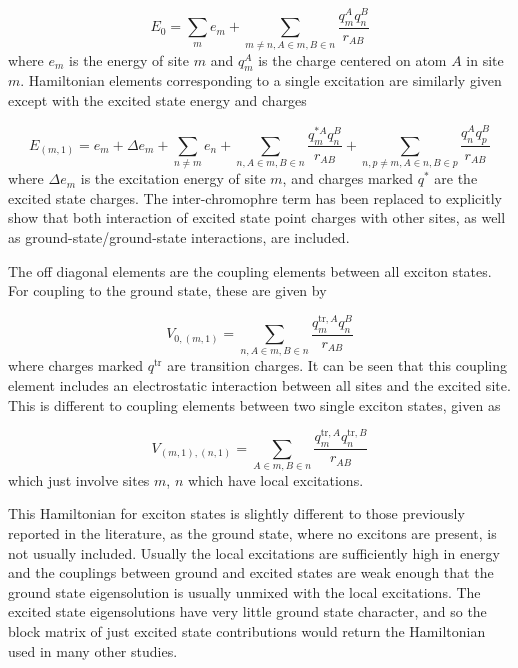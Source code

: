 \begin{equation}
    E_0 = \sum_m e_m + \sum_{m \neq n, A \in m, B \in n} \frac{q^A_m q^B_n}{r_{AB}}
\end{equation}
%
where $e_m$ is the energy of site $m$ and $q^A_m$ is the charge centered on atom
$A$ in site $m$. Hamiltonian elements corresponding to a single excitation are similarly
given except with the excited state energy and charges

\begin{equation}
    E_{\left(m,1\right)} = e_m + \Delta e_m + \sum_{n \neq m} e_n + \sum_{n, A \in m, B \in n} \frac{q^{\ast A}_m q^B_n}{r_{AB}} + \sum_{n,p \neq m, A \in n, B \in p} \frac{q^{A}_n q^B_p}{r_{AB}}
\end{equation}
%
where $\Delta e_m$ is the excitation energy of site $m$, and charges marked $q^\ast$
are the excited state charges. The inter-chromophre term has been replaced to explicitly
show that both interaction of excited state point charges with other sites, as well
as ground-state/ground-state interactions, are included.

The off diagonal elements are the coupling elements between all exciton states.
For coupling to the ground state, these are given by

\begin{equation}
    V_{0, \left(m,1\right)} = \sum_{n, A \in m, B \in n} \frac{q^{\text{tr},A}_m q^B_n}{r_{AB}}
\end{equation}
%
where charges marked $q^{\text{tr}}$ are transition charges. It can be seen that 
this coupling element includes an electrostatic interaction between all sites and
the excited site. This is different to coupling elements between two single exciton
states, given as

\begin{equation}
    V_{\left(m, 1\right), \left(n,1\right)} = \sum_{A \in m, B \in n} \frac{q^{\text{tr},A}_m q^{\text{tr},B}_n}{r_{AB}}
    \label{eq:exciton_coupling}
\end{equation}
%
which just involve sites $m$, $n$ which have local excitations.

This Hamiltonian for exciton states is slightly different to those previously reported 
in the literature, as the ground state, where no excitons are present, is not usually
included. Usually the local excitations are sufficiently high in energy and the
couplings between ground and excited states are weak enough that the ground state 
eigensolution is usually unmixed with the local excitations. The excited state eigensolutions
have very little ground state character, and so the block matrix of just excited
state contributions would return the Hamiltonian used in many other studies.


